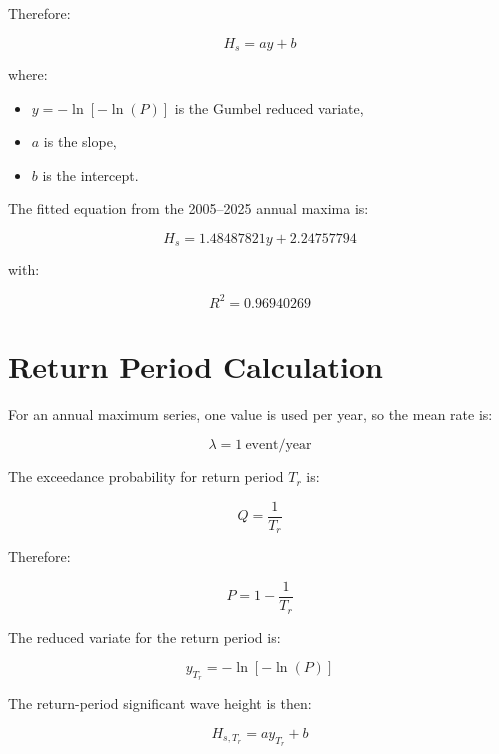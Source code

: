 \documentclass[12pt,a4paper]{article}
\begin{document}
Therefore:

\begin{equation}
H_s = ay + b
\end{equation}

where:

\begin{itemize}
    \item \(y=-\ln[-\ln(P)]\) is the Gumbel reduced variate,
    \item \(a\) is the slope,
    \item \(b\) is the intercept.
\end{itemize}

The fitted equation from the 2005--2025 annual maxima is:

\begin{equation}
H_s = 1.48487821y + 2.24757794
\end{equation}

with:

\begin{equation}
R^2 = 0.96940269
\end{equation}

\section{Return Period Calculation}

For an annual maximum series, one value is used per year, so the mean rate is:

\[
\lambda = 1\ \text{event/year}
\]

The exceedance probability for return period \(T_r\) is:

\begin{equation}
Q = \frac{1}{T_r}
\end{equation}

Therefore:

\begin{equation}
P = 1-\frac{1}{T_r}
\end{equation}

The reduced variate for the return period is:

\begin{equation}
y_{T_r} = -\ln[-\ln(P)]
\end{equation}

The return-period significant wave height is then:

\begin{equation}
H_{s,T_r} = ay_{T_r} + b
\end{equation}
\end{document}
